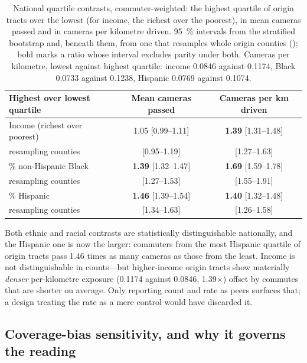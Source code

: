 \documentclass[11pt,twoside]{article}
\begin{document}
\begin{table}[tbp]
\centering
\small
\caption{National quartile contrasts, commuter-weighted: the highest quartile of origin tracts
over the lowest (for income, the richest over the poorest), in mean cameras passed and in
cameras per kilometre driven. \SI{95}{\percent} intervals from the stratified bootstrap and,
beneath them, from one that resamples whole origin counties (); bold
marks a ratio whose interval excludes parity under both. Cameras per kilometre, lowest against
highest quartile: income \num{0.0846} against \num{0.1174}, Black \num{0.0733} against
\num{0.1238}, Hispanic \num{0.0769} against \num{0.1074}.}
\label{tab:demo}
\begin{tabular}{lcc}
\toprule
Highest over lowest quartile & Mean cameras passed & Cameras per km driven \\
\midrule
Income (richest over poorest)  & 1.05 [0.99--1.11]            & \textbf{1.39} [1.31--1.48] \\
\quad resampling counties      & [0.95--1.19]                 & [1.27--1.63] \\
\% non-Hispanic Black          & \textbf{1.39} [1.32--1.47]   & \textbf{1.69} [1.59--1.78] \\
\quad resampling counties      & [1.27--1.53]                 & [1.55--1.91] \\
\% Hispanic                    & \textbf{1.46} [1.39--1.54]   & \textbf{1.40} [1.32--1.48] \\
\quad resampling counties      & [1.34--1.63]                 & [1.26--1.58] \\
\bottomrule
\end{tabular}
\end{table}

Both ethnic and racial contrasts are statistically distinguishable nationally, and the
Hispanic one is now the larger: commuters from the most Hispanic quartile of origin tracts
pass \num{1.46} times as many cameras as those from the least. Income is not
distinguishable in counts---but higher-income origin tracts show materially \emph{denser}
per-kilometre exposure (\num{0.1174} against \num{0.0846}, \num{1.39}$\times$) offset by
commutes that are shorter on average. Only reporting count and rate as peers surfaces that; a design treating the rate as a mere
control would have discarded it.

\subsection{Coverage-bias sensitivity, and why it governs the reading}
\label{sec:results:coverage}
\end{document}

